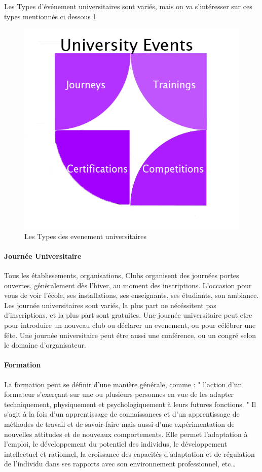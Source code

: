 \documentclass[12pt]{report}
\begin{document}
Les Types d'événement universitaires sont variés, mais on va s'intéresser sur ces types mentionnés ci dessous \ref{fig:typesevenementuniversitaire}
\begin{figure}[h]
    \centering
    \includegraphics[width=.5\textwidth]{TypesEvents}
    \caption{Les Types des evenement universitaires}
    \label{fig:typesevenementuniversitaire}
\end{figure}
\paragraph{Journée Universitaire}


Tous les établissements, organisations, Clubs organisent des journées portes ouvertes, généralement dès l’hiver, au moment des inscriptions. L’occasion pour vous de voir l’école, ses installations, ses enseignants, ses étudiants, son ambiance\cite{21}.\\

Les journée universitaires sont variés, la plus part ne nécéssitent pas d'inscriptions, et la plus part sont gratuites. 
Une journée universitaire peut etre pour introduire un nouveau club ou déclarer un evenement, ou pour célébrer une féte. 
Une journée universitaire peut étre aussi une conférence, ou un congré selon le domaine d'organisateur.

\paragraph{Formation}

La formation peut se définir d’une manière générale, comme : " l’action d’un formateur s’exerçant  sur une ou plusieurs personnes en vue de les adapter techniquement, physiquement et psychologiquement à leurs futures fonctions. " Il s’agit à la fois d’un apprentissage de connaissances et d’un apprentissage de méthodes de travail et de savoir-faire mais aussi d’une expérimentation de nouvelles attitudes et de nouveaux comportements. Elle permet l’adaptation à l’emploi, le développement du potentiel des individus, le développement intellectuel et rationnel, la croissance des capacités d’adaptation et de régulation de l’individu dans ses rapports avec son environnement professionnel, etc…\cite{21}
\end{document}

